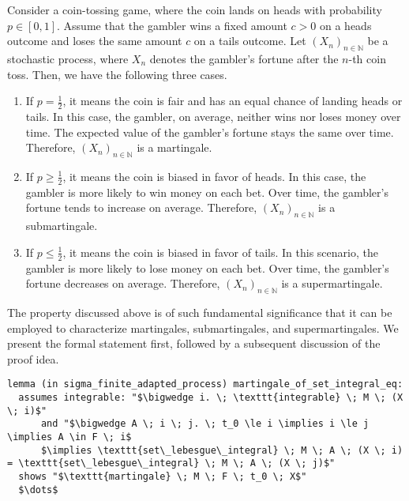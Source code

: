 \begin{example}
Consider a coin-tossing game, where the coin lands on heads with probability $p \in [0,1]$. Assume that the gambler wins a fixed amount $c > 0$ on a heads outcome and loses the same amount $c$ on a tails outcome. Let $(X_n)_{n \in \mathbb{N}}$ be a stochastic process, where $X_n$ denotes the gambler's fortune after the $n$-th coin toss. Then, we have the following three cases.
\begin{enumerate}
\item If $p = \frac{1}{2}$, it means the coin is fair and has an equal chance of landing heads or tails. In this case, the gambler, on average, neither wins nor loses money over time. The expected value of the gambler's fortune stays the same over time. Therefore, $(X_n)_{n \in \mathbb{N}}$ is a martingale.
\item If $p \ge \frac{1}{2}$, it means the coin is biased in favor of heads. In this case, the gambler is more likely to win money on each bet. Over time, the gambler's fortune tends to increase on average. Therefore, $(X_n)_{n \in \mathbb{N}}$ is a submartingale.
\item If $p \le \frac{1}{2}$, it means the coin is biased in favor of tails. In this scenario, the gambler is more likely to lose money on each bet. Over time, the gambler's fortune decreases on average. Therefore, $(X_n)_{n \in \mathbb{N}}$ is a supermartingale.
\end{enumerate}
\end{example}

The property discussed above is of such fundamental significance that it can be employed to characterize martingales, submartingales, and supermartingales. We present the formal statement first, followed by a subsequent discussion of the proof idea.

\begin{isalemma}
{\small
\begin{lstlisting}[style=isabelle]
lemma (in sigma_finite_adapted_process) martingale_of_set_integral_eq:
  assumes integrable: "$\bigwedge i. \; \texttt{integrable} \; M \; (X \; i)$"
      and "$\bigwedge A \; i \; j. \; t_0 \le i \implies i \le j \implies A \in F \; i$
	  $\implies \texttt{set\_lebesgue\_integral} \; M \; A \; (X \; i) = \texttt{set\_lebesgue\_integral} \; M \; A \; (X \; j)$" 
  shows "$\texttt{martingale} \; M \; F \; t_0 \; X$"
  $\dots$
\end{lstlisting}
}
\end{isalemma}

